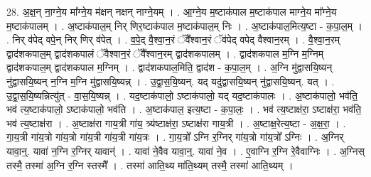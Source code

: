 \documentclass[17pt]{extarticle}
\begin{document}
28. अ॒क्ष॒न् ना॒ग्ने॒य मा᳚ग्ने॒य म॑क्षन् नक्षन् नाग्ने॒यम् । . आ॒ग्ने॒य म॒ष्टाक॑पाल म॒ष्टाक॑पाल माग्ने॒य मा᳚ग्ने॒य म॒ष्टाक॑पालम् । . अ॒ष्टाक॑पाल॒म् निर् णिर॒ष्टाक॑पाल म॒ष्टाक॑पाल॒म् निः । . अ॒ष्टाक॑पाल॒मित्य॒ष्टा - क॒पा॒ल॒म् । . निर् व॑पेद् वपे॒न् निर् णिर् व॑पेत् । . व॒पे॒द् वै॒श्वा॒न॒रं ॅवै᳚श्वान॒रं ॅव॑पेद् वपेद् वैश्वान॒रम् । . वै॒श्वा॒न॒रम् द्वाद॑शकपाल॒म् द्वाद॑शकपालं ॅवैश्वान॒रं ॅवै᳚श्वान॒रम् द्वाद॑शकपालम् । . द्वाद॑शकपाल म॒ग्नि म॒ग्निम् द्वाद॑शकपाल॒म् द्वाद॑शकपाल म॒ग्निम् । . द्वाद॑शकपाल॒मिति॒ द्वाद॑श - क॒पा॒ल॒म् । . अ॒ग्नि मु॑द्वासयि॒ष्यन् नु॑द्वासयि॒ष्यन् न॒ग्नि म॒ग्नि मु॑द्वासयि॒ष्यन्न् । . उ॒द्वा॒स॒यि॒ष्यन्. यद् यदु॑द्वासयि॒ष्यन् नु॑द्वासयि॒ष्यन्. यत् । . उ॒द्वा॒स॒यि॒ष्यन्नित्यु॑त् - वा॒स॒यि॒ष्यन्न् । . यद॒ष्टाक॑पालो॒ ऽष्टाक॑पालो॒ यद् यद॒ष्टाक॑पालः । . अ॒ष्टाक॑पालो॒ भव॑ति॒ भव॑ त्य॒ष्टाक॑पालो॒ ऽष्टाक॑पालो॒ भव॑ति । . अ॒ष्टाक॑पाल॒ इत्य॒ष्टा - क॒पा॒लः॒ । . भव॑ त्य॒ष्टाक्ष॑रा॒ ऽष्टाक्ष॑रा॒ भव॑ति॒ भव॑ त्य॒ष्टाक्ष॑रा । . अ॒ष्टाक्ष॑रा गाय॒त्री गा॑य॒ त्र्य॑ष्टाक्ष॑रा॒ ऽष्टाक्ष॑रा गाय॒त्री । . अ॒ष्टाक्ष॒रेत्य॒ष्टा - अ॒क्ष॒रा॒ । . गा॒य॒त्री गा॑य॒त्रो गा॑य॒त्रो गा॑य॒त्री गा॑य॒त्री गा॑य॒त्रः । . गा॒य॒त्रो᳚ ऽग्नि र॒ग्निर् गा॑य॒त्रो गा॑य॒त्रो᳚ ऽग्निः । . अ॒ग्निर् यावा॒न्॒. यावा॑ न॒ग्नि र॒ग्निर् यावान्॑ । . यावा॑ ने॒वैव यावा॒न्॒. यावा॑ ने॒व । . ए॒वाग्नि र॒ग्नि रे॒वैवाग्निः । . अ॒ग्निस् तस्मै॒ तस्मा॑ अ॒ग्नि र॒ग्नि स्तस्मै᳚ । . तस्मा॑ आति॒थ्य मा॑ति॒थ्यम् तस्मै॒ तस्मा॑ आति॒थ्यम् । \newline
\end{document}
